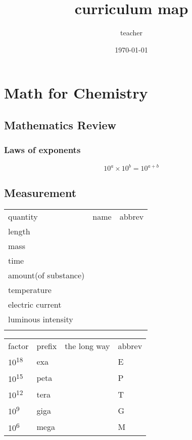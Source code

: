 \documentclass[11pt]{article}
\author{teacher}
\date{\today}
\title{curriculum map}
\begin{document}
\maketitle
\tableofcontents


\section{Math for Chemistry}
\label{sec:org5489b82}

\subsection{Mathematics Review}
\label{sec:orgc5dc70c}

\subsubsection{Laws of exponents}
\label{sec:orgf8f5f6e}

$$10^a \times 10^b = 10^{a+b}$$

\subsection{Measurement}
\label{sec:org6edff11}

\begin{center}
\begin{tabular}{lll}
quantity & name & abbrev\\[0pt]
length &  & \\[0pt]
mass &  & \\[0pt]
time &  & \\[0pt]
amount(of substance) &  & \\[0pt]
temperature &  & \\[0pt]
electric current &  & \\[0pt]
luminous intensity &  & \\[0pt]
 &  & \\[0pt]
\end{tabular}
\end{center}

\begin{center}
\begin{tabular}{llll}
factor & prefix & the long way & abbrev\\[0pt]
10\textsuperscript{18} & exa &  & E\\[0pt]
10\textsuperscript{15} & peta &  & P\\[0pt]
10\textsuperscript{12} & tera &  & T\\[0pt]
10\textsuperscript{9} & giga &  & G\\[0pt]
10\textsuperscript{6} & mega &  & M\\[0pt]
\end{tabular}
\end{center}
\end{document}
